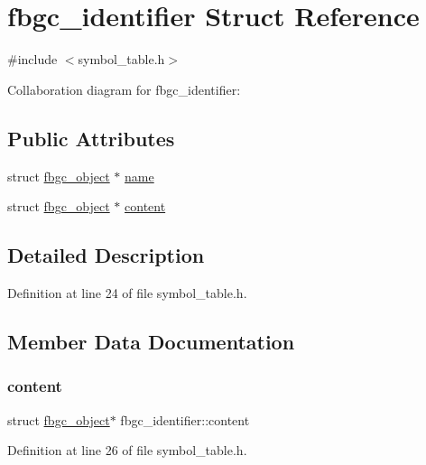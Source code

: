 \hypertarget{structfbgc__identifier}{}\section{fbgc\+\_\+identifier Struct Reference}
\label{structfbgc__identifier}


{\ttfamily \#include $<$symbol\+\_\+table.\+h$>$}



Collaboration diagram for fbgc\+\_\+identifier\+:
\subsection*{Public Attributes}
\begin{DoxyCompactItemize}
\item 
struct \hyperlink{structfbgc__object}{fbgc\+\_\+object} $\ast$ \hyperlink{structfbgc__identifier_aa4b055e0f90c3c47b0d9ba08a307c480}{name}
\item 
struct \hyperlink{structfbgc__object}{fbgc\+\_\+object} $\ast$ \hyperlink{structfbgc__identifier_ada2251c9a8032c1c764c040ee7991236}{content}
\end{DoxyCompactItemize}


\subsection{Detailed Description}


Definition at line 24 of file symbol\+\_\+table.\+h.



\subsection{Member Data Documentation}
\mbox{\label{structfbgc__identifier_ada2251c9a8032c1c764c040ee7991236}} 
\subsubsection{\texorpdfstring{content}{content}}
{\footnotesize\ttfamily struct \hyperlink{structfbgc__object}{fbgc\+\_\+object}$\ast$ fbgc\+\_\+identifier\+::content}



Definition at line 26 of file symbol\+\_\+table.\+h.

